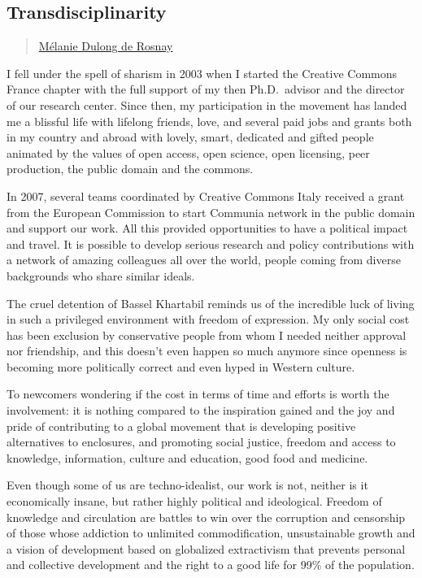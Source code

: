 \subsection{Transdisciplinarity}\label{transdisciplinarity}

\begin{quote}
\href{../appendix/attributions.html\#melanie-dulong-de-rosnay}{Mélanie
Dulong de Rosnay}
\end{quote}

I fell under the spell of sharism in 2003 when I started the Creative
Commons France chapter with the full support of my then Ph.D.~advisor
and the director of our research center. Since then, my participation in
the movement has landed me a blissful life with lifelong friends, love,
and several paid jobs and grants both in my country and abroad with
lovely, smart, dedicated and gifted people animated by the values of
open access, open science, open licensing, peer production, the public
domain and the commons.

In 2007, several teams coordinated by Creative Commons Italy received a
grant from the European Commission to start Communia network in the
public domain and support our work. All this provided opportunities to
have a political impact and travel. It is possible to develop serious
research and policy contributions with a network of amazing colleagues
all over the world, people coming from diverse backgrounds who share
similar ideals.

The cruel detention of Bassel Khartabil reminds us of the incredible
luck of living in such a privileged environment with freedom of
expression. My only social cost has been exclusion by conservative
people from whom I needed neither approval nor friendship, and this
doesn't even happen so much anymore since openness is becoming more
politically correct and even hyped in Western culture.

To newcomers wondering if the cost in terms of time and efforts is worth
the involvement: it is nothing compared to the inspiration gained and
the joy and pride of contributing to a global movement that is
developing positive alternatives to enclosures, and promoting social
justice, freedom and access to knowledge, information, culture and
education, good food and medicine.

Even though some of us are techno-idealist, our work is not, neither is
it economically insane, but rather highly political and ideological.
Freedom of knowledge and circulation are battles to win over the
corruption and censorship of those whose addiction to unlimited
commodification, unsustainable growth and a vision of development based
on globalized extractivism that prevents personal and collective
development and the right to a good life for 99\% of the population.
